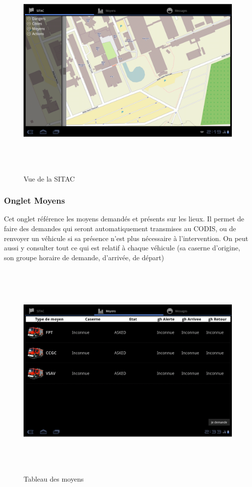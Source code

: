 \documentclass{article}
\begin{document}
\begin{figure}[htbp]
\begin{center}
\includegraphics[width=487pt, height=309pt]{Manueldutilisation-fig001.png}
\caption{Vue de la SITAC}
\end{center}
\end{figure}

\subsubsection{Onglet Moyens}

Cet onglet référence les moyens demandés et présents sur les 
lieux. Il permet de faire des demandes qui seront automatiquement transmises au 
CODIS, ou de renvoyer un véhicule si sa présence n'est plus nécessaire à l'intervention. 
On peut aussi y consulter tout ce qui est relatif à chaque véhicule (sa 
caserne d'origine, son groupe horaire de demande, d'arrivée, 
de départ)

\begin{figure}[htbp]
\begin{center}
\includegraphics[width=487pt, height=309pt]{Manueldutilisation-fig002.png}
\caption{Tableau des moyens}
\end{center}
\end{figure}
\end{document}
